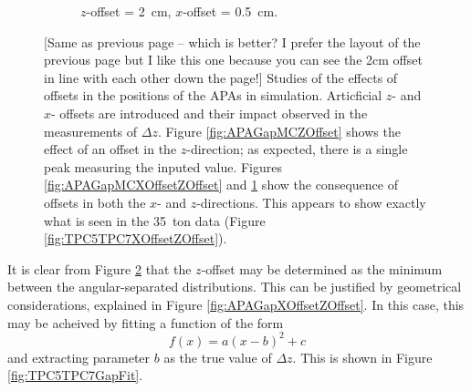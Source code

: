 \begin{figure}[p]
\begin{subfigure}[t]{\linewidth}
    \caption{$z$-offset = 2~cm, $x$-offset = 0.5~cm.}
    \label{fig:APAGapMCXOffsetZOffsetAngle}
  \end{subfigure}
  \caption{[Same as previous page -- which is better?  I prefer the layout of the previous page but I like this one because you can see the 2cm offset in line with each other down the page!]  Studies of the effects of offsets in the positions of the APAs in simulation.  Articficial $z$- and $x$- offsets are introduced and their impact observed in the measurements of $\Delta z$.  Figure \ref{fig:APAGapMCZOffset} shows the effect of an offset in the $z$-direction; as expected, there is a single peak measuring the inputed value.  Figures \ref{fig:APAGapMCXOffsetZOffset} and \ref{fig:APAGapMCXOffsetZOffsetAngle} show the consequence of offsets in both the $x$- and $z$-directions.  This appears to show exactly what is seen in the 35~ton data (Figure \ref{fig:TPC5TPC7XOffsetZOffset}).}
  \label{fig:APAGapMC}
\end{figure}

It is clear from Figure \ref{fig:APAGapMC} that the $z$-offset may be determined as the minimum between the angular-separated distributions.  This can be justified by geometrical considerations, explained in Figure \ref{fig:APAGapXOffsetZOffset}.  In this case, this may be acheived by fitting a function of the form
\begin{equation}
  f(x) = a(x-b)^2+c
\end{equation}
and extracting parameter $b$ as the true value of $\Delta z$.  This is shown in Figure \ref{fig:TPC5TPC7GapFit}.

